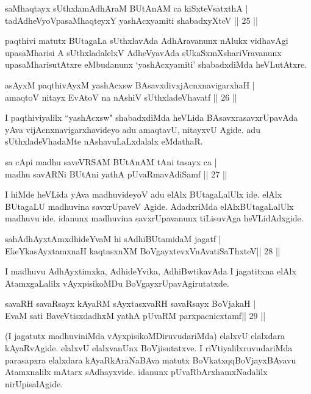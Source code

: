 \begin{shl}
saMhaqtayx sUthxlamAdhAraM BUtAnAM ca kiSxteVsatxthA |\\
tadAdheVyoVpasaMhaqteyxY yashAcxyamiti shabadxyXteV \hfill || 25 || 
\end{shl}
\begin{artha}
paqthivi matutx BUtagaLa sUthxlavAda AdhAravanunx nAlukx vidhavAgi upasaMharisi A sUthxladalelxV AdheVyavAda sUkaSxmXshariVravanunx upasaMharisutAtxre eMbudanunx `yashAcxyamiti' shabadxdiMda heVLutAtxre.
\end{artha}
\begin{shl}
asAyxM paqthivAyxM yashAcxsw BAsavxdivxjAcnxnavigarxhaH |\\
amaqtoV nitayx EvAtoV na nAshiV sUthxladeVhavatf \hfill || 26 || 
\end{shl}
\begin{artha}
I paqthiviyalilx ``yashAcxsw" shabadxdiMda heVLida  BAsavxrasavxrUpavAda yAva vijAcnxnavigarxhavideyo adu amaqtavU, nitayxvU Agide. adu sUthxladeVhadaMte nAshavuLaLxdalalx eMdathaR. 
\end{artha}
\begin{shl}
sa cApi madhu saveVRSAM BUtAnAM tAni tasayx ca |\\
madhu savARNi BUtAni yathA pUvaRmavAdiSamf \hfill || 27 || 
\end{shl}
\begin{artha}
I hiMde heVLida yAva madhuvideyoV adu elAlx BUtagaLalUlx ide. elAlx BUtagaLU madhuvina savxrUpaveV Agide. AdadxriMda elAlxBUtagaLalUlx madhuvu ide. idanunx madhuvina savxrUpavanunx tiLisuvAga heVLidAdxgide.    
\end{artha}
\begin{shl}
sahAdhAyxtAmxdhideYvaM hi sAdhiBUtamidaM jagatf |\\
EkeYkasAyx\s \s tamxnaH kaqtasxnXM BoVgayxtevxVnAvatiSaThxteV\hfill  || 28 || 
\end{shl}
\begin{artha}
I madhuvu AdhAyxtimxka, AdhideYvika, AdhiBwtikavAda I jagatitxna elAlx AtamxgaLalilx vAyxpisikoMDu BoVgayxrUpavAgirutatxde. 
\end{artha}
\begin{shl}
savaRH savaRsayx kAyaRM sAyxtasxvaRH savaRsayx BoVjakaH |\\
EvaM sati BaveVtisxdadhxM yathA pUvaRM parxpacnicxtamf\hfill  || 29 ||
\end{shl}
\begin{artha}
(I jagatutx madhuviniMda vAyxpisikoMDiruvudariMda) elalxvU elalxdara kAyaRvAgide. elalxvU elalxvanUnx BoVjisutatxve. I riVtiyalilxruvudariMda parasapxra elalxdara kAyaRkAraNaBAva matutx BoVkatxqqBoVjayxBAvavu Atamxnalilx mAtarx sAdhayxvide. idanunx pUvaRbArxhamxNadalilx nirUpisalAgide.  
\end{artha}
